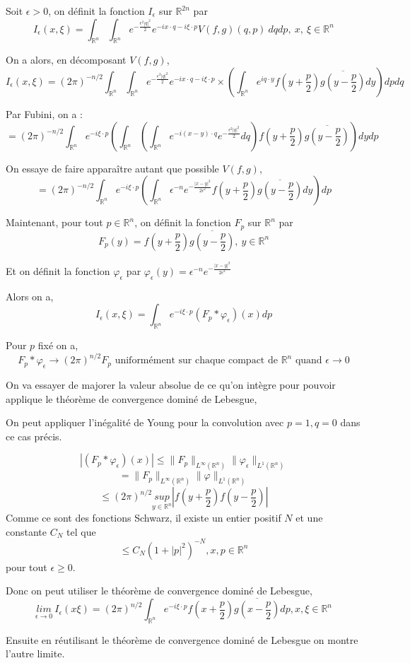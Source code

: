 \documentclass[a4paper, 12pt]{report}
\newcommand{\R}{\mathbb{R}} %
\newcommand{\ra}[1][]{\overset{#1}{\rightarrow}} %
\renewcommand{\.}{\cdot} %
\theoremstyle{break}
\theoremstyle{remark}
\theoremstyle{proofstyle}
\begin{document}
\begin{preuve}
    Soit $\epsilon >0$, on définit la fonction $I_\epsilon$ sur $\R^{2n}$ par
    $$I_\epsilon(x, \xi) = \int_{\R^n} \int_{\R^n} e^{-\frac{\epsilon ^2 |q|^2}{2}} e^{-ix \. q - i \xi \. p}V(f,g)(q,p)~dqdp,~ x,~ \xi \in \R^n$$

    On a alors, en décomposant $V(f,g)$,
    $$I_\epsilon(x, \xi) = (2 \pi)^{-n/2}\int_{\R^n} \int_{\R^n} e^{-\frac{\epsilon ^2 |q|^2}{2}} e^{-ix \. q - i \xi \. p} \times \left(\int_{\R^n} e^{iq\.y} f\left(y+\frac{p}{2}\right) \overline{g\left(y-\frac{p}{2}\right)}dy\right) dp dq$$

    Par Fubini, on a :
    $$= (2 \pi)^{-n/2}\int_{\R^n} e^{ - i \xi \. p} \left(\int_{\R^n}\left(\int_{\R^n}  e^{-i(x-y)\.q}e^{-\frac{\epsilon ^2 |q|^2}{2}} dq\right) f\left(y+\frac{p}{2}\right) \overline{g\left(y-\frac{p}{2}\right)} \right) dy dp$$

    On essaye de faire apparaître autant que possible $V(f,g)$,
    $$= (2 \pi)^{-n/2}\int_{\R^n} e^{ - i \xi \. p} \left(\int_{\R^n} \epsilon^{-n} e^{-\frac{|x-y|^2}{2 \epsilon^2}} f\left(y+\frac{p}{2}\right) \overline{g\left(y-\frac{p}{2}\right)} dy \right)dp$$

    Maintenant, pour tout $p \in \R^n$, on définit la fonction $F_p$ sur $\R^n$ par
    $$F_p(y) = f\left(y+\frac{p}{2}\right)\overline{g\left(y-\frac{p}{2}\right)},~ y \in \R^n$$

    Et on définit la fonction $\varphi_\epsilon$ par $\varphi_\epsilon(y) = \epsilon^{-n} e^{-\frac{|x-y|^2}{2 \epsilon ^2}}$\vspace{5pt}

    Alors on a,
    $$I_\epsilon (x, \xi) = \int_{\R^n} e^{-i \xi \. p}(F_p * \varphi_\epsilon)(x)dp$$

    Pour $p$ fixé on a,
    $$F_p * \varphi_\epsilon \ra (2 \pi) ^{n/2} F_p \text{ uniformément sur chaque compact de } \R^n \text{ quand } \epsilon \ra 0$$

    On va essayer de majorer la valeur absolue de ce qu'on intègre pour pouvoir applique le théorème de convergence dominé de Lebesgue,\vspace{5pt}

    On peut appliquer l'inégalité de Young pour la convolution avec $p =1, q = 0$ dans ce cas précis.

    $$|(F_p * \varphi _\epsilon)(x)| \leq \|F_p\|_{L^\infty(\R^n)} \|\varphi _\epsilon\|_{L^1(\R^n)}$$
    $$= \|F_p\|_{L^\infty(\R^n)} \|\varphi\|_{L^1(\R^n)}$$
    $$\leq (2 \pi) ^{n/2} \underset{y \in \R^n}{sup}\left|f(y+\frac{p}{2}) f(y- \frac{p}{2})\right|$$
    Comme ce sont des fonctions Schwarz, il existe un entier positif $N$ et une constante $C_N$ tel que
    $$\leq C_N (1+|p|^2)^{-N}, x, p \in \R^n$$
    pour tout $\epsilon \geq 0$.

    Donc on peut utiliser le théorème de convergence dominé de Lebesgue,
    $$\underset{\epsilon \ra 0}{lim} ~I_\epsilon (x \xi) = (2 \pi)^{n/2} \int_{\R^n} e^{-i \xi \.p}f(x+ \frac{p}{2}) \overline{g(x-\frac{p}{2})} dp, x, \xi \in \R^n$$

    Ensuite en réutilisant le théorème de convergence dominé de Lebesgue on montre l'autre limite.
\end{preuve}
\end{document}
